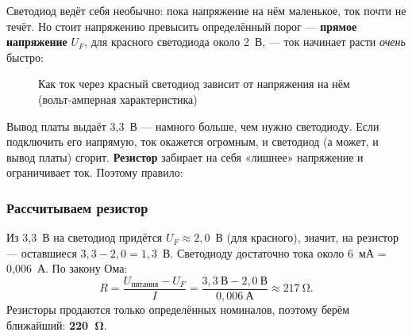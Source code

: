 Светодиод ведёт себя необычно: пока напряжение на нём маленькое, ток почти не течёт. Но стоит
напряжению превысить определённый порог --- \textbf{прямое напряжение} $U_F$, для красного светодиода
около 2~В, --- ток начинает расти \emph{очень} быстро:

\begin{figure}[H]
\centering
{}
\caption{Как ток через красный светодиод зависит от напряжения на нём (вольт-амперная характеристика)}
\end{figure}

Вывод платы выдаёт 3,3~В --- намного больше, чем нужно светодиоду. Если подключить его напрямую, ток
окажется огромным, и светодиод (а может, и вывод платы) сгорит. \textbf{Резистор} забирает на себя
«лишнее» напряжение и ограничивает ток. Поэтому правило:

\begin{center}
\end{center}

\subsubsection{Рассчитываем резистор}

Из 3,3~В на светодиод придётся $U_F \approx 2{,}0$~В (для красного), значит, на резистор ---
оставшиеся $3{,}3 - 2{,}0 = 1{,}3$~В. Светодиоду достаточно тока около 6~мА = 0,006~А. По закону Ома:
\[
  R = \frac{U_\text{питания} - U_F}{I} = \frac{3{,}3~\text{В} - 2{,}0~\text{В}}{0{,}006~\text{А}} \approx 217~\si{\ohm}.
\]
Резисторы продаются только определённых номиналов, поэтому берём ближайший: \textbf{\SI{220}{\ohm}}.


